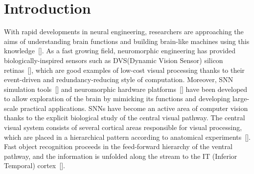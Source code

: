 \section{Introduction}
\label{sec:intro}
With rapid developments in neural engineering, researchers are approaching the aims of understanding brain functions and building brain-like machines using this knowledge~[\cite{furber2007neural}].
As a fast growing field, neuromorphic engineering has provided biologically-inspired sensors such as DVS(Dynamic Vision Sensor) silicon retinas~[\cite{serrano-gotarredona_128_2013, lichtsteiner2008128}], which are good examples of low-cost visual processing thanks to their event-driven and redundancy-reducing style of computation.
Moreover, SNN simulation tools~[\cite{davison2008pynn, gewaltig2007nest, goodman2008brian}] and neuromorphic hardware platforms~[\cite{furber2013overview,  schemmel2010wafer, moradi2014event}] have been developed to allow exploration of the brain by mimicking its functions and developing large-scale practical applications.
SNNs have become an active area of computer vision thanks to the explicit  biological study of the central visual pathway.
The central visual system consists of several cortical areas responsible for visual processing, which are placed in a hierarchical pattern according to anatomical experiments~[\cite{felleman1991distributed}].
Fast object recognition proceeds in  the feed-forward hierarchy of the ventral pathway, and the information is unfolded along the stream to the  IT (Inferior Temporal) cortex~[\cite{dicarlo2012does}].


